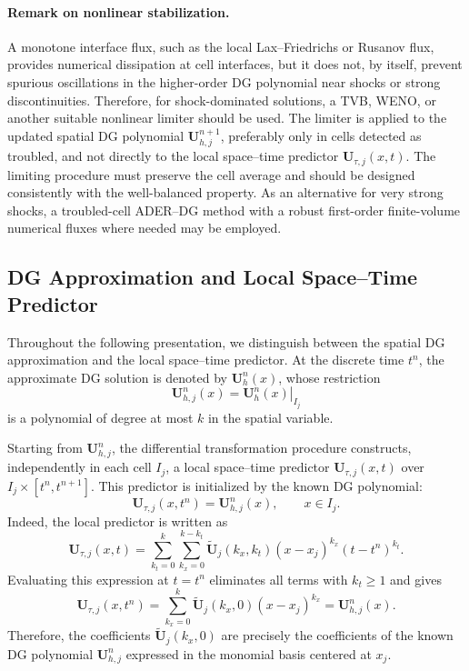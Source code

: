 \documentclass[11pt]{article}
\begin{document}
\paragraph{Remark on nonlinear stabilization.}
A monotone interface flux, such as the local Lax--Friedrichs or Rusanov
flux, provides numerical dissipation at cell interfaces, but it does not,
by itself, prevent spurious oscillations in the higher-order DG polynomial
near shocks or strong discontinuities. Therefore, for shock-dominated
solutions, a TVB, WENO, or another suitable nonlinear limiter should be
used. The limiter is applied to the updated spatial DG polynomial
\(\mathbf{U}_{h,j}^{n+1}\), preferably only in cells detected as troubled,
and not directly to the local space--time predictor
\(\mathbf{U}_{\tau,j}(x,t)\). The limiting procedure must preserve the
cell average and should be designed consistently with the well-balanced
property. As an alternative
for very strong shocks, a troubled-cell ADER--DG method with a robust
first-order finite-volume numerical fluxes where needed may be employed.


\subsection{DG Approximation and Local Space--Time Predictor}

Throughout the following presentation, we distinguish between the spatial
DG approximation and the local space--time predictor. At the discrete time
$t^n$, the approximate DG solution is denoted by $\mathbf{U}_h^n(x)$, whose
restriction
\[
    \mathbf{U}_{h,j}^n(x)
    =
    \left.\mathbf{U}_h^n(x)\right|_{I_j}
\]
is a polynomial of degree at most $k$ in the spatial variable.

Starting from $\mathbf{U}_{h,j}^n$, the differential transformation
procedure constructs, independently in each cell $I_j$, a local
space--time predictor $\mathbf{U}_{\tau,j}(x,t)$ over
$I_j\times[t^n,t^{n+1}]$. This predictor is initialized by the known DG
polynomial:
\begin{equation}
    \mathbf{U}_{\tau,j}(x,t^n)
    =
    \mathbf{U}_{h,j}^n(x),
    \qquad x\in I_j.
    \label{eq:predictor-initialization}
\end{equation}
Indeed, the local predictor is written as
\[
    \mathbf{U}_{\tau,j}(x,t)
    =
    \sum_{k_t=0}^{k}
    \sum_{k_x=0}^{k-k_t}
    \widetilde{\mathbf{U}}_j(k_x,k_t)
    (x-x_j)^{k_x}(t-t^n)^{k_t}.
\]
Evaluating this expression at $t=t^n$ eliminates all terms with
$k_t\geq 1$ and gives
\[
    \mathbf{U}_{\tau,j}(x,t^n)
    =
    \sum_{k_x=0}^{k}
    \widetilde{\mathbf{U}}_j(k_x,0)(x-x_j)^{k_x}
    =
    \mathbf{U}_{h,j}^n(x).
\]
Therefore, the coefficients
$\widetilde{\mathbf{U}}_j(k_x,0)$ are precisely the coefficients of the
known DG polynomial $\mathbf{U}_{h,j}^n$ expressed in the monomial basis
centered at $x_j$.
\end{document}
